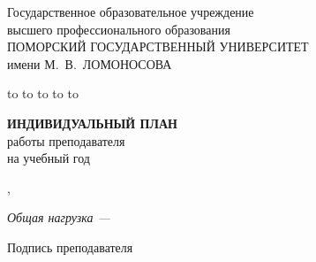 
\begin{center}
Государственное образовательное учреждение\\
высшего профессионального образования\\
ПОМОРСКИЙ  ГОСУДАРСТВЕННЫЙ УНИВЕРСИТЕТ\\
имени М.~В.~ЛОМОНОСОВА
\end{center}

\vspace{3em}

\hbox to 
\hbox to 
\hbox to \textwidth {\hbox{\und}\hfil\hbox{\und}}
\hbox to \textwidth {\hbox{\und}\hfil\hbox{\und}}
\vspace{1em}
\hbox to \textwidth {\hbox{\date}\hfil\hbox{\date}}


\vspace{5em}

\begin{center}\Large
{\bf ИНДИВИДУАЛЬНЫЙ ПЛАН}\\
работы преподавателя\\
на \year{} учебный год
\end{center}

\vspace{3em}

\begin{center}\Large
{\bf\fio}

\position{} \kafedra{},

\degree{}


{\small\em Общая нагрузка --- \pageref{TotalHours}}

\end{center}


\vfil

Подпись преподавателя\und


